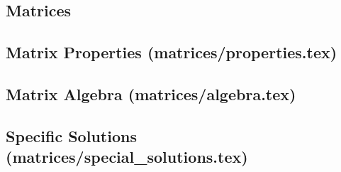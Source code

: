 \documentclass[\fontheight]{extarticle}
\begin{document}
\begin{multicols*}{3}


    \section{Matrices}
    \subsection{Matrix Properties (matrices/properties.tex)}
    
    \subsection{Matrix Algebra (matrices/algebra.tex)}
    
    \subsection{Specific Solutions (matrices/special\_solutions.tex)}
    

\end{multicols*}
\end{document}
